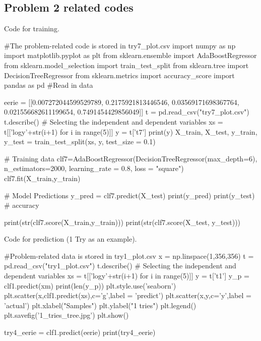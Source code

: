\documentclass[12pt]{article}
\begin{document}
\subsection{Problem 2 related codes}
Code for training.
\begin{python}
#The problem-related code is stored in try7_plot.csv
    import numpy as np
    import matplotlib.pyplot as plt
    from sklearn.ensemble import AdaBoostRegressor
    from sklearn.model_selection import train_test_split
    from sklearn.tree import DecisionTreeRegressor
    from sklearn.metrics import accuracy_score
    import pandas as pd
    #Read in data

    eerie = [[0.007272044599529789, 0.2175921813446546, 0.03569171698367764, 0.021556682611199654, 0.7491454429856049]]
    t = pd.read_csv("try7_plot.csv")
    t.describe()
    # Selecting the independent and dependent variables
    xs = t[['logy'+str(i+1) for i in range(5)]]
    y = t['t7']
    print(y)
    X_train, X_test, y_train, y_test = train_test_split(xs, y, test_size = 0.1)

    # Training data
    clf7=AdaBoostRegressor(DecisionTreeRegressor(max_depth=6), n_estimators=2000, learning_rate = 0.8, loss = "square")
    clf7.fit(X_train,y_train)

    # Model Predictions
    y_pred = clf7.predict(X_test)
    print(y_pred)
    print(y_test)
    # accuracy

    print(str(clf7.score(X_train,y_train)))
    print(str(clf7.score(X_test, y_test)))
\end{python}
Code for prediction (1 Try as an example).
\begin{python}
#Problem-related data is stored in try1_plot.csv
    x = np.linspace(1,356,356)
    t = pd.read_csv("try1_plot.csv")
    t.describe()
    # Selecting the independent and dependent variables
    xs = t[['logy'+str(i+1) for i in range(5)]]
    y = t['t1']
    y_p = clf1.predict(xm)
    print(len(y_p))
    plt.style.use('seaborn')
    plt.scatter(x,clf1.predict(xs),c='g',label = 'predict')
    plt.scatter(x,y,c='y',label = 'actual')
    plt.xlabel("Samples")
    plt.ylabel("1 tries")
    plt.legend()
    plt.savefig('1_tries_tree.jpg')
    plt.show()

    try4_eerie = clf1.predict(eerie)
    print(try4_eerie)
\end{python}
\end{document}
